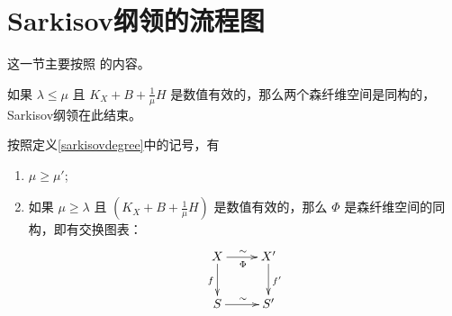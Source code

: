 \section{Sarkisov纲领的流程图 }
这一节主要按照 \cite[\S1]{brunoLogSarkisovProgram1995}的内容。

如果 $ \lambda\leqslant\mu $ 且 $ K_X+B+\frac{1}{\mu}H $ 是数值有效的，那么两个森纤维空间是同构的，Sarkisov纲领在此结束。
\begin{theorem}\label{nfi}
  按照定义\ref{sarkisovdegree}中的记号，有
  \begin{enumerate}
    \item $ \mu\geqslant \mu' $;
    \item 如果 $ \mu \geqslant \lambda $ 且 $ (K_X+B+\frac{1}{\mu} H) $ 是数值有效的，那么 $\Phi$ 是森纤维空间的同构，即有交换图表：
          \[ \xymatrix{
              X\ar[r]^\sim_\Phi\ar[d]_f&X'\ar[d]^{f'}\\
              S\ar[r]^\sim& S' } \]
  \end{enumerate}
\end{theorem}

